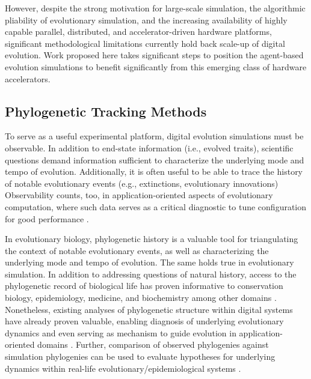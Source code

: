 However, despite the strong motivation for large-scale simulation, the algorithmic pliability of evolutionary simulation, and the increasing availability of highly capable parallel, distributed, and accelerator-driven hardware platforms, significant methodological limitations currently hold back scale-up of digital evolution.
Work proposed here takes significant steps to position the agent-based evolution simulations to benefit significantly from this emerging class of hardware accelerators.

\subsection{Phylogenetic Tracking Methods}

To serve as a useful experimental platform, digital evolution simulations must be observable.
In addition to end-state information (i.e., evolved traits), scientific questions demand information sufficient to characterize the underlying mode and tempo of evolution.
Additionally, it is often useful to be able to trace the history of notable evolutionary events (e.g., extinctions, evolutionary innovations)
Observability counts, too, in application-oriented aspects of evolutionary computation, where such data serves as a critical diagnostic to tune configuration for good performance \citep{hernandez2022can}.

In evolutionary biology, phylogenetic history is a valuable tool for triangulating the context of notable evolutionary events, as well as characterizing the underlying mode and tempo of evolution.
The same holds true in evolutionary simulation.
In addition to addressing questions of natural history, access to the phylogenetic record of biological life has proven informative to conservation biology, epidemiology, medicine, and biochemistry among other domains \citep{faithConservationEvaluationPhylogenetic1992, STAMATAKIS2005phylogenetics, frenchHostPhylogenyShapes2023,kim2006discovery}.
Nonetheless, existing analyses of phylogenetic structure within digital systems have already proven valuable, enabling diagnosis of underlying evolutionary dynamics \citep{moreno2023toward,hernandez2022can,shahbandegan2022untangling, lewinsohnStatedependentEvolutionaryModels2023a} and even serving as mechanism to guide evolution in application-oriented domains \citep{lalejini2024phylogeny,lalejini2024runtime,murphy2008simple,burke2003increased}.
Further, comparison of observed phylogenies against simulation phylogenies can be used to evaluate hypotheses for underlying dynamics within real-life evolutionary/epidemiological systems \citep{giardina2017inference,voznica2022deep}.

